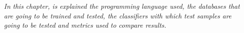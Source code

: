\minitoc
\mtcskip

\begin{small}
\emph{In this chapter, is explained the programming language used, the databases that are going to be trained and tested, the classifiers with which test samples are going to be tested and metrics used to compare results.}
\end{small} 





